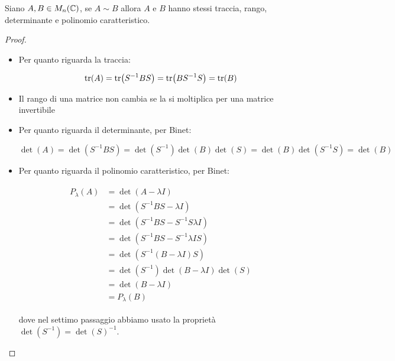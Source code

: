 \begin{definition}\label{prop:similar-matrix-properties}
	Siano $ A,B \in M_{n}(\mathbb{C}) $, se $ A \sim B $ allora $ A $ e $ B $ hanno stessi traccia, rango, determinante e polinomio caratteristico.
\end{definition}

\begin{proof}
	\begin{itemize}
		\item Per quanto riguarda la traccia:

		\begin{equation}
			\tr(A) = \tr(S^{-1} B S) = \tr(B S^{-1} S) = \tr(B)
		\end{equation}

		\item Il rango di una matrice non cambia se la si moltiplica per una matrice invertibile

		\item Per quanto riguarda il determinante, per Binet:

		\begin{equation}
			\det(A) = \det(S^{-1} B S) %
			= \det(S^{-1}) \det(B) \det(S) %
			= \det(B) \det(S^{-1} S) %
			= \det(B)
		\end{equation}

		\item Per quanto riguarda il polinomio caratteristico, per Binet:
		
		\begin{align}
			\begin{split}
				P_{\lambda}(A) &= \det(A - \lambda I) \\
				&= \det(S^{-1} B S - \lambda I) \\
				&= \det(S^{-1} B S - S^{-1} S \lambda I) \\
				&= \det(S^{-1} B S - S^{-1} \lambda I S) \\
				&= \det(S^{-1} (B - \lambda I) S) \\
				&= \det(S^{-1}) \det(B - \lambda I) \det(S) \\
				&= \det(B - \lambda I) \\
				&= P_{\lambda}(B)
			\end{split}
		\end{align}
	
			dove nel settimo passaggio abbiamo usato la proprietà $ \det(S^{-1}) = \det(S)^{-1} $.
	\end{itemize}
\end{proof}

